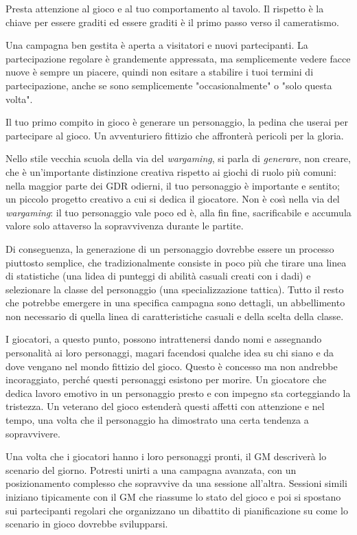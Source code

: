 Presta attenzione al gioco e al tuo comportamento al tavolo. Il rispetto è la chiave per essere graditi ed essere graditi è il primo passo verso il cameratismo.

Una campagna ben gestita è aperta a visitatori e nuovi partecipanti. La partecipazione regolare è grandemente appressata, ma semplicemente vedere facce nuove è sempre un piacere, quindi non esitare a stabilire i tuoi termini di partecipazione, anche se sono semplicemente "occasionalmente" o "solo questa volta".


Il tuo primo compito in gioco è generare un personaggio, la pedina che userai per partecipare al gioco. Un avventuriero fittizio che affronterà pericoli per la gloria.

Nello stile vecchia scuola della via del \textit{wargaming}, si parla di \textit{generare}, non creare, che è un'importante distinzione creativa rispetto ai giochi di ruolo più comuni: nella maggior parte dei GDR odierni, il tuo personaggio è importante e sentito; un piccolo progetto creativo a cui si dedica il giocatore. Non è così nella via del \textit{wargaming}: il tuo personaggio vale poco ed è, alla fin fine, sacrificabile e accumula valore solo attaverso la sopravvivenza durante le partite.

Di conseguenza, la generazione di un personaggio dovrebbe essere un processo piuttosto semplice, che tradizionalmente consiste in poco più che tirare una linea di statistiche (una lidea di punteggi di abilità casuali creati con i dadi) e selezionare la classe del personaggio (una specializzazione tattica). Tutto il resto che potrebbe emergere in una specifica campagna sono dettagli, un abbellimento non necessario di quella linea di caratteristiche casuali e della scelta della classe.

I giocatori, a questo punto, possono intrattenersi dando nomi e assegnando personalità ai loro personaggi, magari facendosi qualche idea su chi siano e da dove vengano nel mondo fittizio del gioco. Questo è concesso ma non andrebbe incoraggiato, perché questi personaggi esistono per morire. Un giocatore che dedica lavoro emotivo in un personaggio presto e con impegno sta corteggiando la tristezza. Un veterano del gioco estenderà questi affetti con attenzione e nel tempo, una volta che il personaggio ha dimostrato una certa tendenza a sopravvivere.


Una volta che i giocatori hanno i loro personaggi pronti, il GM descriverà lo scenario del giorno. Potresti unirti a una campagna avanzata, con un posizionamento complesso che sopravvive da una sessione all'altra. Sessioni simili iniziano tipicamente con il GM che riassume lo stato del gioco e poi si spostano sui partecipanti regolari che organizzano un dibattito di pianificazione su come lo scenario in gioco dovrebbe svilupparsi.

